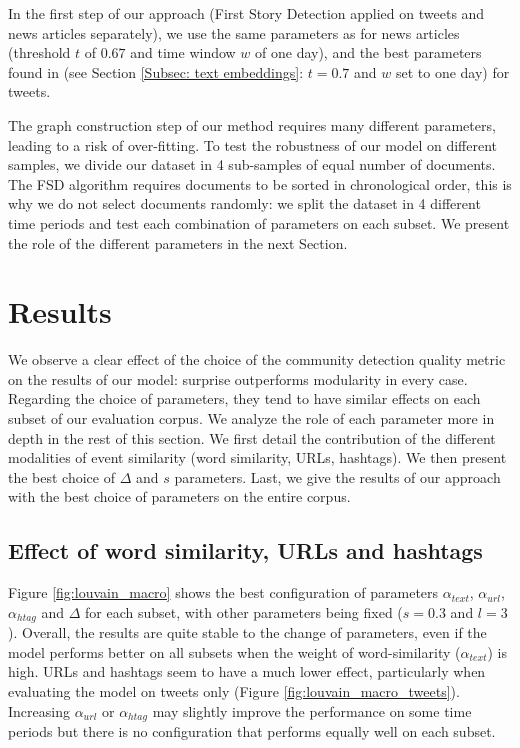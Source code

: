 In the first step of our approach (First Story Detection applied on tweets and news articles separately), we use the same parameters as \cite{cage2020production} for news articles (threshold $t$ of $0.67$ and time window $w$ of one day), and the best parameters found in  \cite{mazoyer2020french} (see Section \ref{Subsec: text embeddings}: $t=0.7$ and $w$ set to one day) for tweets.

The graph construction step of our method requires many different parameters, leading to a risk of over-fitting. To test the robustness of our model on different samples, we divide our dataset in 4 sub-samples of equal number of documents. The FSD algorithm requires documents to be sorted in chronological order, this is why we do not select documents randomly: we split the dataset in 4 different time periods and test each combination of parameters on each subset. We present the role of the different parameters in the next Section.

\section{Results}

We observe a clear effect of the choice of the community detection quality metric on the results of our model: surprise outperforms modularity in every case. Regarding the choice of parameters, they tend to have similar effects on each subset of our evaluation corpus. We analyze the role of each parameter more in depth in the rest of this section. We first detail the contribution of the different modalities of event similarity (word similarity, URLs, hashtags). We then present the best choice of $\Delta$ and $s$ parameters. Last, we give the results of our approach with the best choice of parameters on the entire corpus.

\subsection{Effect of word similarity, URLs and hashtags}
Figure \ref{fig:louvain_macro} shows 
the best configuration of parameters $\alpha_{text}$, $\alpha_{url}$, $\alpha_{htag}$ and $\Delta$ for each subset, with other parameters being fixed ($s = 0.3$ and $l = 3$). Overall, the results are quite stable to the change of parameters, even if the model performs better on all subsets when the weight of word-similarity ($\alpha_{text}$) is high. URLs and hashtags seem to have a much lower effect, particularly when evaluating the model on tweets only (Figure \ref{fig:louvain_macro_tweets}). Increasing $\alpha_{url}$ or $\alpha_{htag}$ may slightly improve the performance on some time periods but there is no configuration that performs equally well on each subset.

